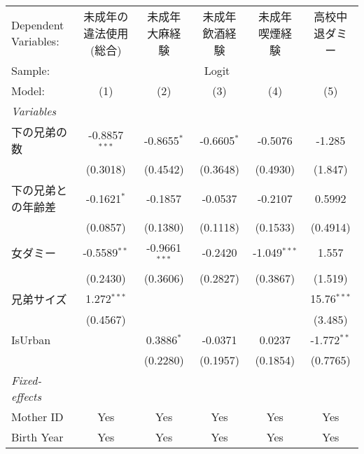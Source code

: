 \documentclass{article}
\begin{document}
\begin{landscape}


\begingroup
\centering
\begin{tabular}{lccccc}
   \tabularnewline \midrule \midrule
   Dependent Variables: & 未成年の違法使用(総合) & 未成年大麻経験  & 未成年飲酒経験 & 未成年喫煙経験 & 高校中退ダミー\\  
   Sample: & \multicolumn{5}{c}{Logit} \\ 
   Model:               & (1)                    & (2)             & (3)            & (4)            & (5)\\  
   \midrule
   \emph{Variables}\\
   下の兄弟の数         & -0.8857$^{***}$        & -0.8655$^{*}$   & -0.6605$^{*}$  & -0.5076        & -1.285\\   
                        & (0.3018)               & (0.4542)        & (0.3648)       & (0.4930)       & (1.847)\\   
   下の兄弟との年齢差   & -0.1621$^{*}$          & -0.1857         & -0.0537        & -0.2107        & 0.5992\\   
                        & (0.0857)               & (0.1380)        & (0.1118)       & (0.1533)       & (0.4914)\\   
   女ダミー             & -0.5589$^{**}$         & -0.9661$^{***}$ & -0.2420        & -1.049$^{***}$ & 1.557\\   
                        & (0.2430)               & (0.3606)        & (0.2827)       & (0.3867)       & (1.519)\\   
   兄弟サイズ           & 1.272$^{***}$          &                 &                &                & 15.76$^{***}$\\   
                        & (0.4567)               &                 &                &                & (3.485)\\   
   IsUrban              &                        & 0.3886$^{*}$    & -0.0371        & 0.0237         & -1.772$^{**}$\\   
                        &                        & (0.2280)        & (0.1957)       & (0.1854)       & (0.7765)\\   
   \midrule
   \emph{Fixed-effects}\\
   Mother ID            & Yes                    & Yes             & Yes            & Yes            & Yes\\  
   Birth Year           & Yes                    & Yes             & Yes            & Yes            & Yes\\  

\end{tabular}
\end{landscape}
\end{document}
